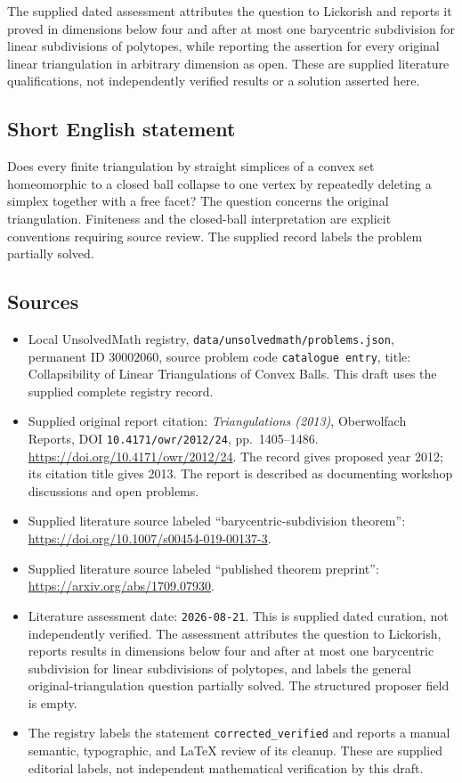 \documentclass[11pt]{article}
\begin{document}
The supplied dated assessment attributes the question to Lickorish and reports it proved in dimensions below four and after at most one barycentric subdivision for linear subdivisions of polytopes, while reporting the assertion for every original linear triangulation in arbitrary dimension as open. These are supplied literature qualifications, not independently verified results or a solution asserted here.
\subsection{Short English statement}
Does every finite triangulation by straight simplices of a convex set homeomorphic to a closed ball collapse to one vertex by repeatedly deleting a simplex together with a free facet? The question concerns the original triangulation. Finiteness and the closed-ball interpretation are explicit conventions requiring source review. The supplied record labels the problem partially solved.
\subsection{Sources}
\begin{itemize}
\item Local UnsolvedMath registry, \texttt{data/unsolvedmath/problems.json}, permanent ID \(30002060\), source problem code \texttt{catalogue entry}, title: Collapsibility of Linear Triangulations of Convex Balls. This draft uses the supplied complete registry record.
\item Supplied original report citation: \emph{Triangulations (2013)}, Oberwolfach Reports, DOI \texttt{10.4171/owr/2012/24}, pp.\ 1405--1486. \url{https://doi.org/10.4171/owr/2012/24}. The record gives proposed year 2012; its citation title gives 2013. The report is described as documenting workshop discussions and open problems.
\item Supplied literature source labeled ``barycentric-subdivision theorem'': \url{https://doi.org/10.1007/s00454-019-00137-3}.
\item Supplied literature source labeled ``published theorem preprint'': \url{https://arxiv.org/abs/1709.07930}.
\item Literature assessment date: \texttt{2026-08-21}. This is supplied dated curation, not independently verified. The assessment attributes the question to Lickorish, reports results in dimensions below four and after at most one barycentric subdivision for linear subdivisions of polytopes, and labels the general original-triangulation question partially solved. The structured proposer field is empty.
\item The registry labels the statement \texttt{corrected\_verified} and reports a manual semantic, typographic, and LaTeX review of its cleanup. These are supplied editorial labels, not independent mathematical verification by this draft.
\end{itemize}
\end{document}
